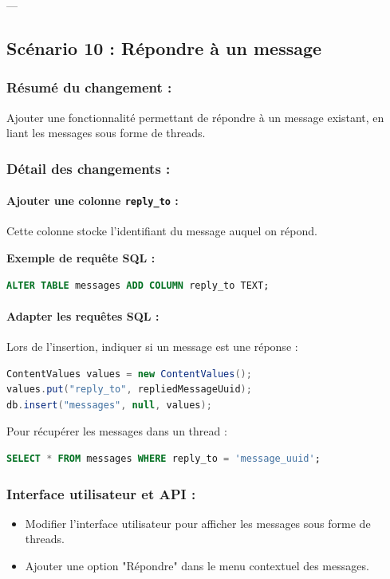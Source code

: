 \documentclass[a4paper,11pt]{article}
\begin{document}
---

\subsection*{Scénario 10 : Répondre à un message}

\subsubsection*{Résumé du changement :}
Ajouter une fonctionnalité permettant de répondre à un message existant, en liant les messages sous forme de threads.

\subsubsection*{Détail des changements :}

\paragraph{Ajouter une colonne \texttt{reply\_to} :}
Cette colonne stocke l'identifiant du message auquel on répond.

\textbf{Exemple de requête SQL :}
\begin{lstlisting}[language=SQL]
ALTER TABLE messages ADD COLUMN reply_to TEXT;
\end{lstlisting}

\paragraph{Adapter les requêtes SQL :}
Lors de l'insertion, indiquer si un message est une réponse :
\begin{lstlisting}[language=Java]
ContentValues values = new ContentValues();
values.put("reply_to", repliedMessageUuid);
db.insert("messages", null, values);
\end{lstlisting}

Pour récupérer les messages dans un thread :
\begin{lstlisting}[language=SQL]
SELECT * FROM messages WHERE reply_to = 'message_uuid';
\end{lstlisting}

\subsubsection*{Interface utilisateur et API :}
\begin{itemize}
    \item Modifier l’interface utilisateur pour afficher les messages sous forme de threads.
    \item Ajouter une option "Répondre" dans le menu contextuel des messages.
\end{itemize}
\end{document}
